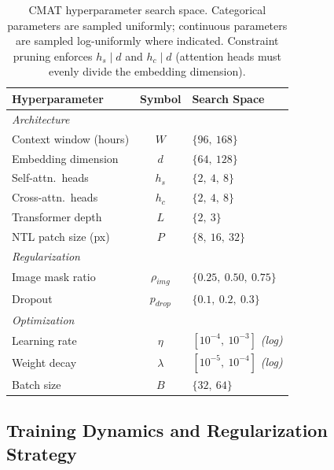 \begin{table}[htbp]
\centering
\caption{CMAT hyperparameter search space. Categorical parameters are sampled uniformly; continuous parameters are sampled log-uniformly where indicated. Constraint pruning enforces $h_s \mid d$ and $h_c \mid d$ (attention heads must evenly divide the embedding dimension).}
\label{tab:cmat_hparams}
\footnotesize
\begin{tabularx}{\columnwidth}{l c X}
\toprule
\textbf{Hyperparameter} & \textbf{Symbol}
    & \textbf{Search Space} \\
\midrule
\multicolumn{3}{l}{\textit{Architecture}} \\
\addlinespace[2pt]
Context window (hours) & $W$
    & $\{96,\ 168\}$ \\
Embedding dimension    & $d$
    & $\{64,\ 128\}$ \\
Self-attn.\ heads      & $h_s$
    & $\{2,\ 4,\ 8\}$ \\
Cross-attn.\ heads     & $h_c$
    & $\{2,\ 4,\ 8\}$ \\
Transformer depth      & $L$
    & $\{2,\ 3\}$ \\
NTL patch size (px)    & $P$
    & $\{8,\ 16,\ 32\}$ \\
\midrule
\multicolumn{3}{l}{\textit{Regularization}} \\
\addlinespace[2pt]
Image mask ratio       & $\rho_{img}$
    & $\{0.25,\ 0.50,\ 0.75\}$ \\
Dropout                & $p_{drop}$
    & $\{0.1,\ 0.2,\ 0.3\}$ \\
\midrule
\multicolumn{3}{l}{\textit{Optimization}} \\
\addlinespace[2pt]
Learning rate          & $\eta$
    & $[10^{-4},\ 10^{-3}]$ \textit{(log)} \\
Weight decay           & $\lambda$
    & $[10^{-5},\ 10^{-4}]$ \textit{(log)} \\
Batch size             & $B$
    & $\{32,\ 64\}$ \\
\bottomrule
\end{tabularx}
\end{table}


\subsection{Training Dynamics and Regularization Strategy}
\label{subsec:training_dynamics}

